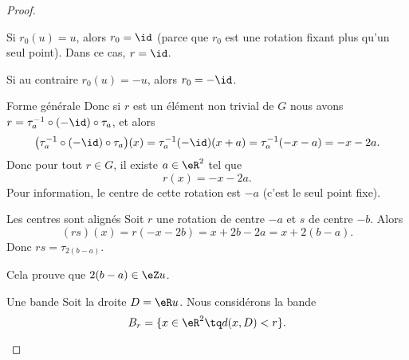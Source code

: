 \begin{proof}
\begin{subproof}
\begin{subproof}
			Si \( r_0(u)=u\), alors \( r_0=\id\) (parce que \( r_0\) est une rotation fixant plus qu'un seul point). Dans ce cas, \( r=\id\).

			Si au contraire \( r_0(u)=-u\), alors \( r_0=-\id\).

			\item[Forme générale]
			Donc si \( r\) est un élément non trivial de \( G\) nous avons \( r=\tau_a^{-1}\circ(-\id)\circ\tau_a\), et alors
			\begin{equation}
				\big( \tau_a^{-1}\circ(-\id)\circ\tau_a \big)(x)=\tau_a^{-1}  (-\id)(x+a)=\tau_a^{-1}(-x-a)=-x-2a.
			\end{equation}
			Donc pour tout \( r\in G\), il existe \( a\in \eR^2\) tel que
			\begin{equation}        \label{EQooQGNVooKyCCYW}
				r(x)=-x-2a.
			\end{equation}
			Pour information, le centre de cette rotation est \( -a\) (c'est le seul point fixe).

			\item[Les centres sont alignés]
			Soit \( r\) une rotation de centre \( -a\) et \( s\) de centre \( -b\). Alors
			\begin{equation}
				(rs)(x)=r(-x-2b)=x+2b-2a=x+2(b-a).
			\end{equation}
			Donc \( rs=\tau_{2(b-a)}\).

			Cela prouve que \(2(b-a)\in \eZ u\).

			\item[Une bande]
			Soit la droite \( D=\eR u\). Nous considérons la bande
			\begin{equation}
				B_r=\{ x\in \eR^2\tq d(x,D)<r \}.
			\end{equation}


\end{subproof}
\end{subproof}
\end{proof}
